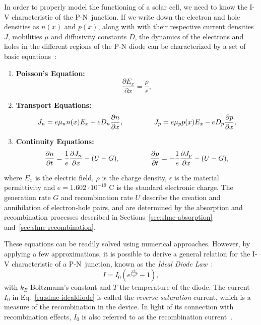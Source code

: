 \begin{refsection}
In order to properly model the functioning of a solar cell, we need to know 
the I-V characteristic of the P-N~junction. If we write down the electron and 
hole densities as $n(x)$ and $p(x)$, along with with their respective current 
densities $J$, mobilities $\mu$ and diffusivity constants $D$, the dynamics of 
the electrons and holes in the different regions of the P-N diode can be 
characterized by a set of basic equations~\cite{Shockley1949}: 
\vspace{0.1in} 
\begin{enumerate} 
\item \textbf{Poisson's Equation: } \begin{equation}\frac{\partial 
E_x}{\partial x} = \frac{\rho}{\epsilon},\end{equation} 
 
\item \textbf{Transport Equations: } \begin{equation}J_n = e \mu_n n(x) E_x + 
e D_n\frac{\partial n }{\partial x}, \hspace{0.6in} J_p = e \mu_p p(x) E_x - e 
D_p \frac{\partial p}{\partial x},\end{equation} 
 
\item \textbf{Continuity Equations: } \begin{equation}\frac{\partial 
n}{\partial t} = \frac{1}{e} \frac{\partial J_n}{\partial x} - (U - G), 
\hspace{0.6in} \frac{\partial p}{\partial t} = - \frac{1}{e} \frac{\partial 
J_p}{\partial x} - (U - G),\end{equation} 
 
\end{enumerate} 
where $E_x$ is the electric field, $\rho$ is the charge density, $\epsilon$ is 
the material permittivity and $e = 1.602\cdot 10^{-19}$ C is the standard 
electronic charge. The generation rate $G$ and recombination rate $U$ describe 
the creation and annihilation of electron-hole pairs, and are determined by 
the absorption and recombination processes described in 
Sections~\ref{sec:slme-absorption} and~\ref{sec:slme-recombination}.  
 
These equations can be readily solved using numerical approaches. However, by 
applying a few approximations, it is possible to derive a general relation for 
the I-V characteristic of a P-N~junction, known as the \textit{Ideal Diode 
Law}~\cite{Shockley1949}: 
\begin{equation}\label{eq:slme-idealdiode} 
I = I_0 (e^\frac{e V}{k_B T} - 1), 
\end{equation} 
with $k_B$ Boltzmann's constant and $T$ the temperature of the diode. The 
current $I_0$ in Eq.~\ref{eq:slme-idealdiode} is called the \textit{reverse 
saturation} current, which is a measure of the recombination in the device. In 
light of its connection with recombination effects, $I_0$ is also referred to 
as the recombination current~\cite{Cuevas2014}. 
 

\end{refsection}
